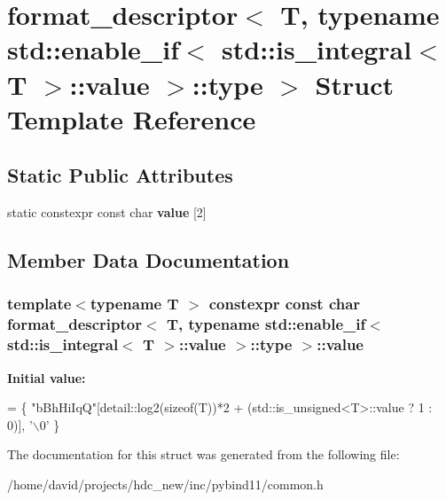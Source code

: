 \hypertarget{structformat__descriptor_3_01_t_00_01typename_01std_1_1enable__if_3_01std_1_1is__integral_3_01_t2fecd774bccb0cabb38b4b9e77a8ebc1}{}\section{format\+\_\+descriptor$<$ T, typename std\+:\+:enable\+\_\+if$<$ std\+:\+:is\+\_\+integral$<$ T $>$\+:\+:value $>$\+:\+:type $>$ Struct Template Reference}
\label{structformat__descriptor_3_01_t_00_01typename_01std_1_1enable__if_3_01std_1_1is__integral_3_01_t2fecd774bccb0cabb38b4b9e77a8ebc1}
\subsection*{Static Public Attributes}
\begin{DoxyCompactItemize}
\item 
static constexpr const char {\bfseries value} \mbox{[}2\mbox{]}
\end{DoxyCompactItemize}


\subsection{Member Data Documentation}
\subsubsection[{\texorpdfstring{value}{value}}]{\setlength{\rightskip}{0pt plus 5cm}template$<$typename T $>$ constexpr const char {\bf format\+\_\+descriptor}$<$ T, typename std\+::enable\+\_\+if$<$ std\+::is\+\_\+integral$<$ T $>$\+::value $>$\+::type $>$\+::value\hspace{0.3cm}{\ttfamily [static]}}\hypertarget{structformat__descriptor_3_01_t_00_01typename_01std_1_1enable__if_3_01std_1_1is__integral_3_01_t2fecd774bccb0cabb38b4b9e77a8ebc1_a771db33a6085b7843991319e0f0db08a}{}\label{structformat__descriptor_3_01_t_00_01typename_01std_1_1enable__if_3_01std_1_1is__integral_3_01_t2fecd774bccb0cabb38b4b9e77a8ebc1_a771db33a6085b7843991319e0f0db08a}
{\bfseries Initial value\+:}
\begin{DoxyCode}
=
        \{ \textcolor{stringliteral}{"bBhHiIqQ"}[detail::log2(\textcolor{keyword}{sizeof}(T))*2 + (std::is\_unsigned<T>::value ? 1 : 0)], \textcolor{charliteral}{'\(\backslash\)0'} \}
\end{DoxyCode}


The documentation for this struct was generated from the following file\+:\begin{DoxyCompactItemize}
\item 
/home/david/projects/hdc\+\_\+new/inc/pybind11/common.\+h\end{DoxyCompactItemize}
